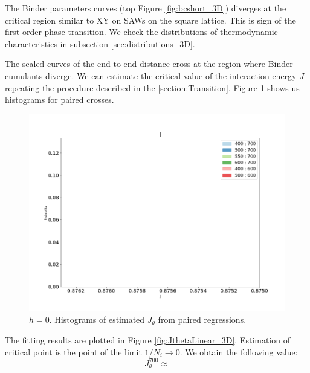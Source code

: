  

The Binder parameters curves (top Figure \ref{fig:bcshort_3D}) diverges at the critical region similar to XY on SAWs on the square lattice. This is sign of the first-order phase transition. We check the distributions of thermodynamic characteristics in subsection \ref{sec:distributions_3D}. 

The scaled curves of the end-to-end distance cross at the region where Binder cumulants diverge. We can estimate the critical value of the interaction energy $J$ repeating the procedure described in the \ref{section:Transition}. Figure \ref{fig:Jthetahistogram_3D} shows us histograms for paired crosses. 

 \begin{figure}
	\centering
	\includegraphics[scale=0.28]{Images/radius_hist_cov_3D.png}
	\caption{$h=0$. Histograms of estimated $J_{\theta}$ from paired regressions.  }
	\label{fig:Jthetahistogram_3D}
\end{figure}

The fitting results are plotted in Figure \ref{fig:JthetaLinear_3D}. Estimation of critical point is the point of the limit $1/N_i \rightarrow 0$. We obtain the following value: 
\begin{equation}
\label{eq:critical_J_theta_3D}
J_{\theta}^{700} \approx    %
\end{equation}

